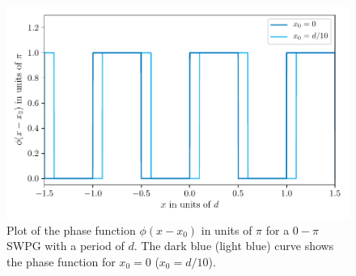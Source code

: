 \begin{figure}
	\centering
	\includegraphics[width=1.0\textwidth]{figures/Two_source/swpg.pdf}
	\caption{Plot of the phase function $\phi(x-x_0)$ in units of $\pi$ for a $0-\pi$ SWPG with a period of $d$.  The dark blue (light blue) curve shows the phase function for $x_0 = 0$ ($x_0=d/10$). }
	\label{fig:swpg}
\end{figure}

